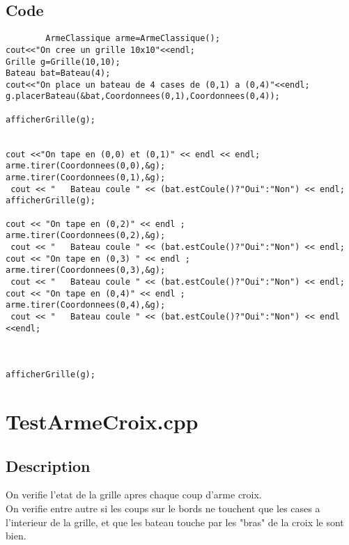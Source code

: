         \subsection{Code}
	\begin{lstlisting}
		ArmeClassique arme=ArmeClassique();
cout<<"On cree un grille 10x10"<<endl;
Grille g=Grille(10,10);
Bateau bat=Bateau(4);
cout<<"On place un bateau de 4 cases de (0,1) a (0,4)"<<endl;
g.placerBateau(&bat,Coordonnees(0,1),Coordonnees(0,4));
	
afficherGrille(g);	


cout <<"On tape en (0,0) et (0,1)" << endl << endl; 
arme.tirer(Coordonnees(0,0),&g);
arme.tirer(Coordonnees(0,1),&g);
 cout << "   Bateau coule " << (bat.estCoule()?"Oui":"Non") << endl;
afficherGrille(g);

cout << "On tape en (0,2)" << endl ; 
arme.tirer(Coordonnees(0,2),&g);
 cout << "   Bateau coule " << (bat.estCoule()?"Oui":"Non") << endl;
cout << "On tape en (0,3) " << endl ; 
arme.tirer(Coordonnees(0,3),&g);
 cout << "   Bateau coule " << (bat.estCoule()?"Oui":"Non") << endl;
cout << "On tape en (0,4)" << endl ; 
arme.tirer(Coordonnees(0,4),&g);
 cout << "   Bateau coule " << (bat.estCoule()?"Oui":"Non") << endl <<endl;



afficherGrille(g);
	\end{lstlisting}
    \section{TestArmeCroix.cpp}
        \subsection{Description}
            On verifie l'etat de la grille apres chaque coup d'arme croix.\\
            On verifie entre autre si les coups sur le bords ne touchent que les cases a l'interieur de la grille, et que les bateau touche par les "bras" de la croix le sont bien.

